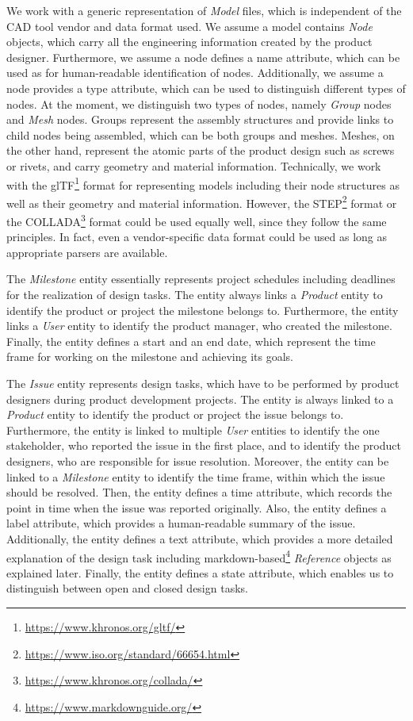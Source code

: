     We work with a generic representation of \textit{Model} files, which is independent of the CAD tool vendor and data format used.
    We assume a model contains \textit{Node} objects, which carry all the engineering information created by the product designer.
    Furthermore, we assume a node defines a name attribute, which can be used as for human-readable identification of nodes.
    Additionally, we assume a node provides a type attribute, which can be used to distinguish different types of nodes.
    At the moment, we distinguish two types of nodes, namely \textit{Group} nodes and \textit{Mesh} nodes.
    Groups represent the assembly structures and provide links to child nodes being assembled, which can be both groups and meshes.
    Meshes, on the other hand, represent the atomic parts of the product design such as screws or rivets, and carry geometry and material information.
    Technically, we work with the glTF\footnote{\url{https://www.khronos.org/gltf/}} format for representing models including their node structures as well as their geometry and material information.
    However, the STEP\footnote{\url{https://www.iso.org/standard/66654.html}} format or the COLLADA\footnote{\url{https://www.khronos.org/collada/}} format could be used equally well, since they follow the same principles.
    In fact, even a vendor-specific data format could be used as long as appropriate parsers are available.

    The \textit{Milestone} entity essentially represents project schedules including deadlines for the realization of design tasks.
    The entity always links a \textit{Product} entity to identify the product or project the milestone belongs to.
    Furthermore, the entity links a \textit{User} entity to identify the product manager, who created the milestone.
    Finally, the entity defines a start and an end date, which represent the time frame for working on the milestone and achieving its goals.

    The \textit{Issue} entity represents design tasks, which have to be performed by product designers during product development projects.
    The entity is always linked to a \textit{Product} entity to identify the product or project the issue belongs to.
    Furthermore, the entity is linked to multiple \textit{User} entities to identify the one stakeholder, who reported the issue in the first place, and to identify the product designers, who are responsible for issue resolution.
    Moreover, the entity can be linked to a \textit{Milestone} entity to identify the time frame, within which the issue should be resolved.
    Then, the entity defines a time attribute, which records the point in time when the issue was reported originally.
    Also, the entity defines a label attribute, which provides a human-readable summary of the issue.
    Additionally, the entity defines a text attribute, which provides a more detailed explanation of the design task including markdown-based\footnote{\url{https://www.markdownguide.org/}} \textit{Reference} objects as explained later.
    Finally, the entity defines a state attribute, which enables us to distinguish between open and closed design tasks.

